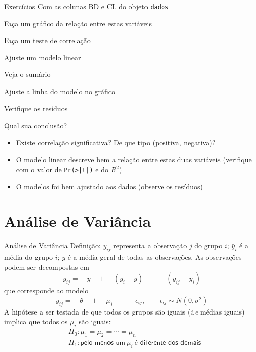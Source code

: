 \documentclass[10pt]{beamer}\usepackage[]{graphicx}\usepackage[]{color}
\theoremstyle{definition}
\begin{document}
\begin{frame}[fragile=singleslide]{Exercícios}
Com as colunas BD e CL do objeto \texttt{dados}
\begin{compactenum}[(1)]
\item Faça um gráfico da relação entre estas variáveis
\item Faça um teste de correlação
\item Ajuste um modelo linear
  \begin{compactenum}[(a)]
  \item Veja o sumário
  \item Ajuste a linha do modelo no gráfico
  \item Verifique os resíduos
  \end{compactenum}
\end{compactenum}
Qual sua conclusão?
\small
\begin{itemize}
\item Existe correlação significativa? De que tipo (positiva, negativa)?
\item O modelo linear descreve bem a relação entre estas duas variáveis
  (verifique com o valor de \verb+Pr(>|t|)+ e do $R^2$)
\item O modelos foi bem ajustado aos dados (observe os resíduos)
\end{itemize}
\end{frame}


\section[ANOVA]{Análise de Variância}


\begin{frame}[fragile=singleslide]{Análise de Variância}
Definição: $y_{ij}$ representa a observação $j$ do grupo $i$;
$\bar{y}_{i}$ é a média do grupo $i$; $\bar{y}$ é a média geral de todas
as observações. As observações podem ser decompostas em
\begin{equation*}
  y_{ij} = \quad \bar{y} \quad + \quad (\bar{y}_{i} - \bar{y}) \quad + \quad
  (y_{ij} - \bar{y}_{i})
\end{equation*}
que corresponde ao modelo
\begin{equation*}
  y_{ij} = \quad \theta \quad + \quad \mu_i \quad + \quad \epsilon_{ij},
  \qquad \epsilon_{ij} \sim N(0, \sigma^2)
\end{equation*}
A hipótese a ser testada de que todos os grupos são iguais (\textit{i.e}
médias iguais) implica que todos os $\mu_{i}$ são iguais:
\begin{align*}
  &H_0: \mu_1 = \mu_2 = \cdots = \mu_n \\
  &H_1: \textsf{pelo menos um}\ \mu_i\ \textsf{é diferente dos demais}
\end{align*}
\end{frame}
\end{document}
